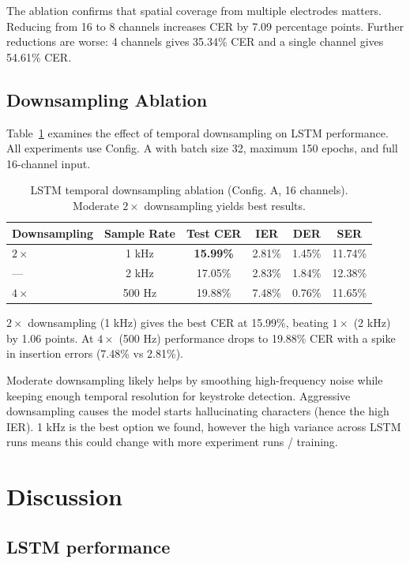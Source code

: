 \documentclass{article}
\begin{document}
The ablation confirms that spatial coverage from multiple electrodes matters. Reducing from 16 to 8 channels increases CER by 7.09 percentage points. Further reductions are worse: 4 channels gives 35.34\% CER and a single channel gives 54.61\% CER.

\subsection{Downsampling Ablation}

Table~\ref{tab:downsampling} examines the effect of temporal downsampling on LSTM performance. All experiments use Config. A with batch size 32, maximum 150 epochs, and full 16-channel input.

\begin{table}[h]
\centering
\caption{LSTM temporal downsampling ablation (Config. A, 16 channels). Moderate $2\times$ downsampling yields best results.}
\label{tab:downsampling}
\begin{tabular}{lccccc}
\toprule
\textbf{Downsampling} & \textbf{Sample Rate} & \textbf{Test CER} & \textbf{IER} & \textbf{DER} & \textbf{SER} \\
\midrule
$2\times$ & 1 kHz & \textbf{15.99\%} & 2.81\% & 1.45\% & 11.74\% \\
--- & 2 kHz & 17.05\% & 2.83\% & 1.84\% & 12.38\% \\
$4\times$ & 500 Hz & 19.88\% & 7.48\% & 0.76\% & 11.65\% \\
\bottomrule
\end{tabular}
\end{table}

$2\times$ downsampling (1 kHz) gives the best CER at 15.99\%, beating $1\times$ (2 kHz) by 1.06 points. At $4\times$ (500 Hz) performance drops to 19.88\% CER with a spike in insertion errors (7.48\% vs 2.81\%).

Moderate downsampling likely helps by smoothing high-frequency noise while keeping enough temporal resolution for keystroke detection. Aggressive downsampling causes the model starts hallucinating characters (hence the high IER). 1 kHz is the best option we found, however the high variance across LSTM runs means this could change with more experiment runs / training.

\section{Discussion}

\subsection{LSTM performance}
\end{document}
